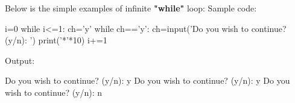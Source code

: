 \setlength{\columnsep}{3pt}


\begin{flushleft}

	
	Below is the simple examples of infinite \textbf{"while"} loop:
	\newline
	Sample code:
	\begin{tcolorbox}[breakable,notitle,boxrule=-0pt,colback=code,colframe=code]
		\color{white}
		\font=8pt
		i=0 \newline
		while i<=1: \newline
		ch='y' \newline
		\hphantom{} \hphantom{} while ch=='y': \newline
		\hphantom{} \hphantom{} \hphantom{} \hphantom{} ch=input('Do you wish to continue? (y/n): ') \newline
		\hphantom{} \hphantom{} print('*'*10) \newline
		\hphantom{} \hphantom{} i+=1 
		\font=4pt

	\end{tcolorbox}

	
	Output:

	\begin{tcolorbox}[breakable,notitle,boxrule=-0pt,colback=output,colframe=output]

		\color{black}

		Do you wish to continue? (y/n): y \newline
		Do you wish to continue? (y/n): y \newline
		Do you wish to continue? (y/n): n

		\font=4pt

	\end{tcolorbox}

	
	
\end{flushleft}



\newpage



